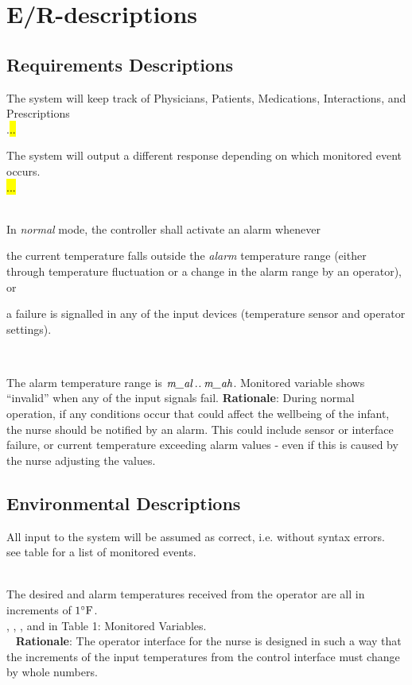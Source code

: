\section{E/R-descriptions}

\subsection{Requirements Descriptions}
{The system will keep track of Physicians, Patients, Medications, Interactions, and Prescriptions\\}
{.\hl{..}}
\label{R1}

{The system will output a different response depending on which monitored event occurs. \\}
{\hl{...} \\~}
\label{R2}

{In \emph{normal} mode, the controller shall activate an alarm whenever 

\begin{mylist}
\item the current temperature falls outside the \emph{alarm} temperature range (either through temperature fluctuation or a change in the alarm range by an operator), or
\item a failure is signalled in any of the input devices (temperature sensor and operator settings).
\end{mylist}~}
{The alarm temperature range is $\textit{m\_al}\mathbin{.\mkern1mu.}\textit{m\_ah}$.
Monitored variable  
shows ``invalid'' when any of the input signals fail.}
\label{R3}
\noindent \textbf{Rationale}: During normal operation, if any conditions occur that could affect the wellbeing of the infant, the nurse should be notified by an alarm. This could include sensor or interface failure, or current temperature exceeding alarm values - even if this is caused by the nurse adjusting the values.

\subsection{Environmental Descriptions}
{All input to the system will be assumed as correct, i.e. without syntax errors.\\}
{see table for a list of monitored events.\\~}
\label{E1}

{The desired and alarm temperatures received from the operator are all in increments of $1 ^{\circ}\mathrm{F}$.\\}
{ , , , and  in Table 1: Monitored Variables.\\~}
\label{E2}
\noindent \textbf{Rationale}: The operator interface for the nurse is designed in such a way that the increments of the input temperatures from the control interface must change by whole numbers.

